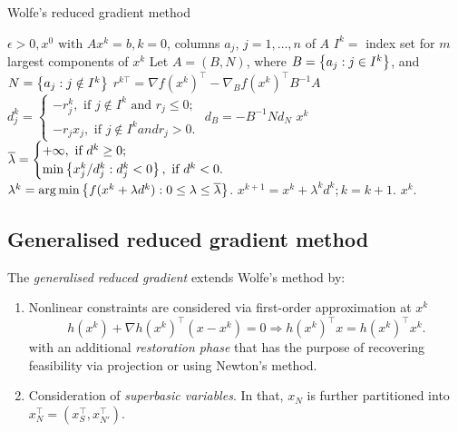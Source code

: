 \begin{algorithm}[H]
\caption{Wolfe's reduced gradient method} \label{Alg3}
\begin{algorithmic}[1] %
 $\epsilon > 0, x^0 \text{ with } Ax^k = b, k = 0$, columns $a_j$, $j = 1, \dots, n$ of $A$  
    \State $I^k = $ index set for $m$ largest components of $x^k$
    \State Let $A = (B, N)$, where $B = \left\{ a_j : j \in I^k \right \}$, and $N = \left\{ a_j : j \notin I^k \right \}$
    \State $r^{k\top} = \nabla f(x^k)^\top - \nabla_B f(x^k)^\top B^{-1}A$
    \State $d^k_j = \begin{cases} -r^k_j, \text{ if } j \notin I^k \text{ and } r_j \leq 0; \\
                                  -r_jx_j, \text{ if } j \notin I^k { and } r_j > 0.   
                            \end{cases}$
     \State $d_B = - B^{-1}Nd_N$
          $x^k$
     \EndIf
    \State $\overline{\lambda} = \begin{cases} +\infty, \text{ if } d^k \geq 0; \\
                                          \min\left\{ x_j^k/d_j^k :  d_j^k < 0 \right \}, \text{ if } d^k < 0.   
                            \end{cases}$                                
    \State $\lambda^k = \arg\min \left\{ f(x^k + \lambda d^k) : 0\leq \lambda \leq \overline{\lambda} \right \}$.
    \State $x^{k+1} = x^k + \lambda^k d^k; k = k+1$.
\EndWhile
{} $x^k$.
\end{algorithmic}
\end{algorithm}
  
\subsection{Generalised reduced gradient method}

The \emph{generalised reduced gradient} extends Wolfe's method by:
\begin{enumerate}
\item Nonlinear constraints are considered via first-order approximation at $x^k$
$$h(x^k) + \nabla h(x^k) ^\top(x - x^k) = 0 \Rightarrow h(x^k) ^\top x =  h(x^k)^\top x^k.
$$
with an additional \emph{restoration phase} that has the purpose of recovering feasibility via projection or using Newton's method.
\item Consideration of \emph{superbasic variables}. In that, $x_N$ is further partitioned into $x_N^\top = (x_S^\top, x_{N'}^\top)$. 
\end{enumerate}

